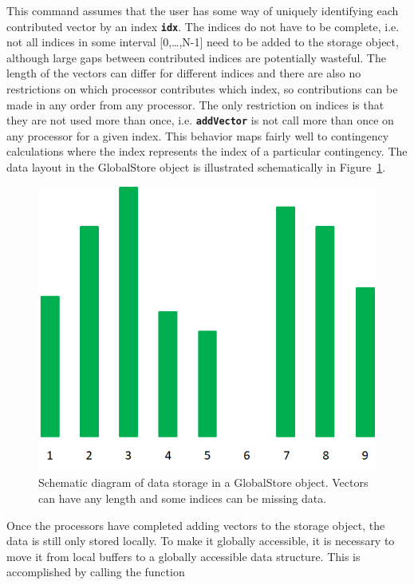 This command assumes that the user has some way of uniquely identifying each contributed vector by an index \texttt{\textbf{idx}}. The indices do not have to be complete, i.e. not all indices in some interval [0,{\dots},N-1] need to be added to the storage object, although large gaps between contributed indices are potentially wasteful. The length of the vectors can differ for different indices and there are also no restrictions on which processor contributes which index, so contributions can be made in any order from any processor. The only restriction on indices is that they are not used more than once, i.e. \texttt{\textbf{addVector}} is not call more than once on any processor for a given index. This behavior maps fairly well to contingency calculations where the index represents the index of a particular contingency. The data layout in the GlobalStore object is illustrated schematically in Figure~\ref{fig:fig-12}.

\begin{figure}
  \centering
    \includegraphics*[width=6.5in, height=3.72in, keepaspectratio=true]{Fig12}
  \caption{Schematic diagram of data storage in a GlobalStore object. Vectors can have any length and some indices can be missing data.}
  \label{fig:fig-12}
\end{figure}



Once the processors have completed adding vectors to the storage object, the data is still only stored locally. To make it globally accessible, it is necessary to move it from local buffers to a globally accessible data structure. This is accomplished by calling the function

